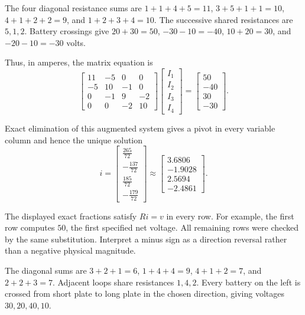 
The four diagonal resistance sums are $1+1+4+5=11$, $3+5+1+1=10$, $4+1+2+2=9$, and $1+2+3+4=10$. The successive shared resistances are $5,1,2$. Battery crossings give $20+30=50$, $-30-10=-40$, $10+20=30$, and $-20-10=-30$ volts.

Thus, in amperes, the matrix equation is
\[ \begin{bmatrix}11 & -5 & 0 & 0\\-5 & 10 & -1 & 0\\0 & -1 & 9 & -2\\0 & 0 & -2 & 10\end{bmatrix}\begin{bmatrix}I_{1}\\I_{2}\\I_{3}\\I_{4}\end{bmatrix}=\begin{bmatrix}50\\-40\\30\\-30\end{bmatrix}.\]

Exact elimination of this augmented system gives a pivot in every variable column and hence the unique solution
\[ i=\begin{bmatrix}\frac{265}{72}\\- \frac{137}{72}\\\frac{185}{72}\\- \frac{179}{72}\end{bmatrix}\approx \begin{bmatrix}3.6806\\-1.9028\\2.5694\\-2.4861\end{bmatrix}.\]

The displayed exact fractions satisfy $Ri=v$ in every row. For example, the first row computes $50$, the first specified net voltage. All remaining rows were checked by the same substitution. Interpret a minus sign as a direction reversal rather than a negative physical magnitude.



The diagonal sums are $3+2+1=6$, $1+4+4=9$, $4+1+2=7$, and $2+2+3=7$. Adjacent loops share resistances $1,4,2$. Every battery on the left is crossed from short plate to long plate in the chosen direction, giving voltages $30,20,40,10$.


